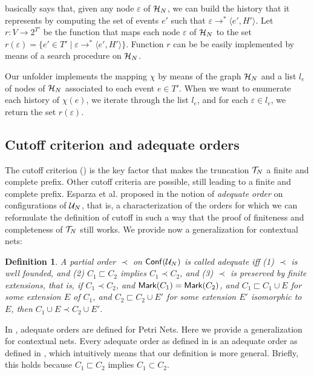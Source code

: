 \documentclass[11pt,a4paper]{article}
\newtheorem{definition}[theorem]{Definition}
\newcommand{\conf}[1]{\ensuremath{\mathsf{Conf}(#1)}}
\begin{document}
 basically says that, given any node $\varepsilon$ of $\mathcal{H}_{N}$,
we can build the history that it represents by computing the set of events $e'$
such that $\varepsilon \to^* \langle e', H' \rangle$.  Let $r \colon V \to
2^{T'}$ be the function that maps each node $\varepsilon$ of $\mathcal{H}_{N}$ to the
set $r (\varepsilon) = \{e' \in T' \mid \varepsilon \to^* \langle e', H'
\rangle\}$.  Function $r$ can be be easily implemented by means of a search
procedure on $\mathcal{H}_{N}$.

Our unfolder implements the mapping $\chi$ by means of the graph $\mathcal{H}_{N}$ and a
list $l_e$ of nodes of $\mathcal{H}_{N}$ associated to each event $e \in T'$.  When we
want to enumerate each history of $\chi(e)$, we iterate through the list $l_e$,
and for each $\varepsilon \in l_e$, we return the set $r(\varepsilon)$.

\subsection{Cutoff criterion and adequate orders}
\label{sec:cutoff.criterion}

The cutoff criterion () is the key factor that makes the
truncation $\mathcal{T}_{N}$ a finite and complete prefix.  Other cutoff criteria are
possible, still leading to a finite and complete prefix.  Esparza et al.
proposed in  the notion of \emph{adequate order} on configurations
of $\mathcal{U}_{N}$, that is, a characterization of the orders for which we can
reformulate the definition of cutoff in such a way that the proof of finiteness
and completeness of $\mathcal{T}_{N}$ still works.  We provide now a generalization
for contextual nets:

\begin{definition}
\label{def:adequate.order}
A partial order $\prec$ on $\conf{\unf N}$ is called \emph{adequate} iff (1)
$\prec$ is well founded, and (2) $C_1 \sqsubset C_2$ implies $C_1 \prec C_2$,
and (3) $\prec$ is preserved by finite extensions, that is, if $C_1 \prec C_2$,
and $\mathsf{Mark }{(C_1)} = \mathsf{Mark }{(C_2)}$, and $C_1 \sqsubset C_1 \cup E$ for some
extension $E$ of $C_1$, and $C_2 \sqsubset C_2 \cup E'$ for some extension $E'$
isomorphic to $E$, then $C_1 \cup E \prec C_2 \cup E'$.
\end{definition}

In , adequate orders are defined for Petri Nets.  Here we provide a
generalization for contextual nets.  Every adequate order as defined in
 is an adequate order as defined in , which
intuitively means that our definition is more general.  Briefly, this holds
because $C_1 \sqsubset C_2$ implies $C_1 \subset C_2$.
\end{document}
